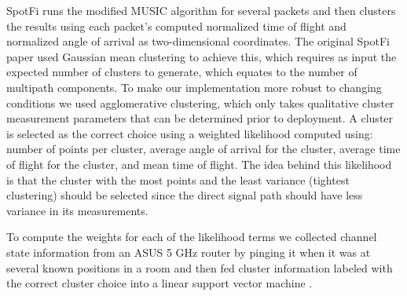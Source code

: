 \documentclass[12pt]{report}
\begin{document}
\begin{figure}[!htb]
    \begin{center}
        \begin{subfigure}[b]{0.3\textwidth}
            \caption{}
            \label{figure: smooothed-csi-matrix}
            \centerline{\scalebox{0.5}{}}
        \end{subfigure}
        \par\bigskip
        \begin{subfigure}[b]{0.3\textwidth}
            \caption{}
            \label{figure: steering-matrix}
            \centerline{\scalebox{0.5}{}}
        \end{subfigure}
        \par\bigskip
        \begin{subfigure}[b]{0.3\textwidth}
            \caption{}
            \label{figure: complex-gains-matrix}
            \centerline{\scalebox{0.5}{}}
        \end{subfigure}
        \par\bigskip
    \end{center}
\end{figure}

SpotFi runs the modified MUSIC algorithm for several packets and then clusters the results using each packet's computed normalized time of flight and normalized angle of arrival as two-dimensional coordinates. The original SpotFi paper used Gaussian mean clustering to achieve this, which requires as input the expected number of clusters to generate, which equates to the number of multipath components. To make our implementation more robust to changing conditions we used agglomerative clustering, which only takes qualitative cluster measurement parameters that can be determined prior to deployment. A cluster is selected as the correct choice using a weighted likelihood computed using: number of points per cluster, average angle of arrival for the cluster, average time of flight for the cluster, and mean time of flight. The idea behind this likelihood is that the cluster with the most points and the least variance (tightest clustering) should be selected since the direct signal path should have less variance in its measurements. \par

To compute the weights for each of the likelihood terms we collected channel state information from an ASUS 5 GHz router by pinging it when it was at several known positions in a room and then fed cluster information labeled with the correct cluster choice into a linear support vector machine \cite{SvmTutorialBurges1998}. \par
\end{document}
